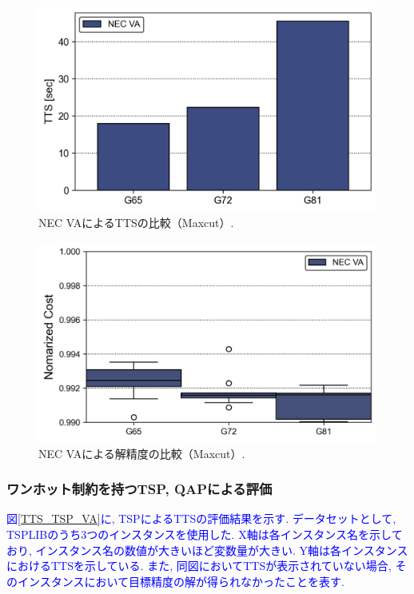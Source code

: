 \documentclass[submit,techrep,noauthor]{ipsj}
\begin{document}
\begin{figure}[t]
\centering
\includegraphics[bb=0 0 700 230, width=15cm]{TTS_Maxcut_VA.png}
\caption{NEC VAによるTTSの比較（Maxcut）.}
\label{TTS_Maxcut_VA}
\end{figure}

\begin{figure}[t]
\centering
\includegraphics[bb=0 0 700 230, width=15cm]{Cost_Maxcut_VA.png}
\caption{NEC VAによる解精度の比較（Maxcut）.}
\label{Cost_Maxcut_VA}
\end{figure}

\subsubsection{ワンホット制約を持つTSP, QAPによる評価}
\textcolor{blue}{図\ref{TTS_TSP_VA}に, TSPによるTTSの評価結果を示す. データセットとして, TSPLIB\cite{tsplib}のうち3つのインスタンスを使用した. X軸は各インスタンス名を示しており, インスタンス名の数値が大きいほど変数量が大きい. Y軸は各インスタンスにおけるTTSを示している. また, 同図においてTTSが表示されていない場合, そのインスタンスにおいて目標精度の解が得られなかったことを表す.}
\end{document}
